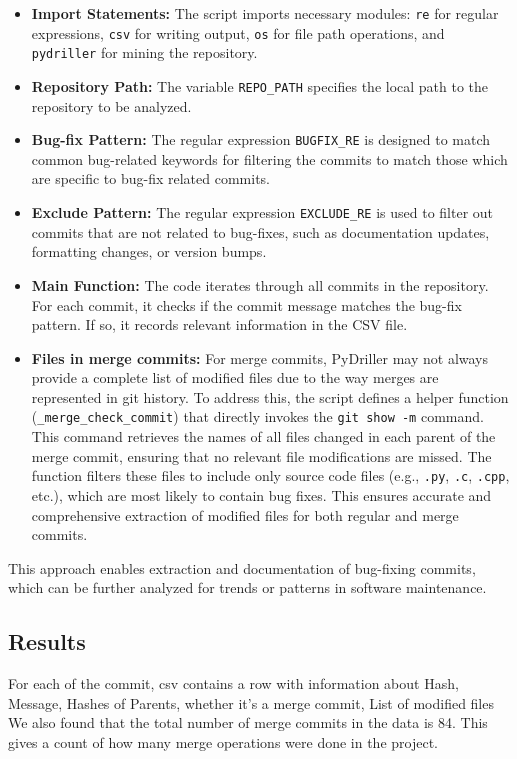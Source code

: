 \documentclass[12pt,a4paper]{article}
\begin{document}
\begin{itemize}
    \item \textbf{Import Statements:} The script imports necessary modules: \texttt{re} for regular expressions, \texttt{csv} for writing output, \texttt{os} for file path operations, and \texttt{pydriller} for mining the repository.
    \item \textbf{Repository Path:} The variable \texttt{REPO\_PATH} specifies the local path to the repository to be analyzed.
    \item \textbf{Bug-fix Pattern:} The regular expression \texttt{BUGFIX\_RE} is designed to match common bug-related keywords for filtering the commits to match those which are specific to bug-fix related commits.
    \item \textbf{Exclude Pattern:} The regular expression \texttt{EXCLUDE\_RE} is used to filter out commits that are not related to bug-fixes, such as documentation updates, formatting changes, or version bumps.
    \item \textbf{Main Function:} The code iterates through all commits in the repository. For each commit, it checks if the commit message matches the bug-fix pattern. If so, it records relevant information in the CSV file.
    \item \textbf{Files in merge commits:} For merge commits, PyDriller may not always provide a complete list of modified files due to the way merges are represented in git history. To address this, the script defines a helper function (\texttt{\_merge\_check\_commit}) that directly invokes the \texttt{git show -m} command. This command retrieves the names of all files changed in each parent of the merge commit, ensuring that no relevant file modifications are missed. The function filters these files to include only source code files (e.g., \texttt{.py}, \texttt{.c}, \texttt{.cpp}, etc.), which are most likely to contain bug fixes. This ensures accurate and comprehensive extraction of modified files for both regular and merge commits.
\end{itemize}

This approach enables extraction and documentation of bug-fixing commits, which can be further analyzed for trends or patterns in software maintenance.

\subsection*{Results}

For each of the commit, csv contains a row with information about Hash, Message, Hashes of Parents, whether it's a merge commit, List of modified files
We also found that the total number of merge commits in the data is 84.  
This gives a count of how many merge operations were done in the project.  
\end{document}
